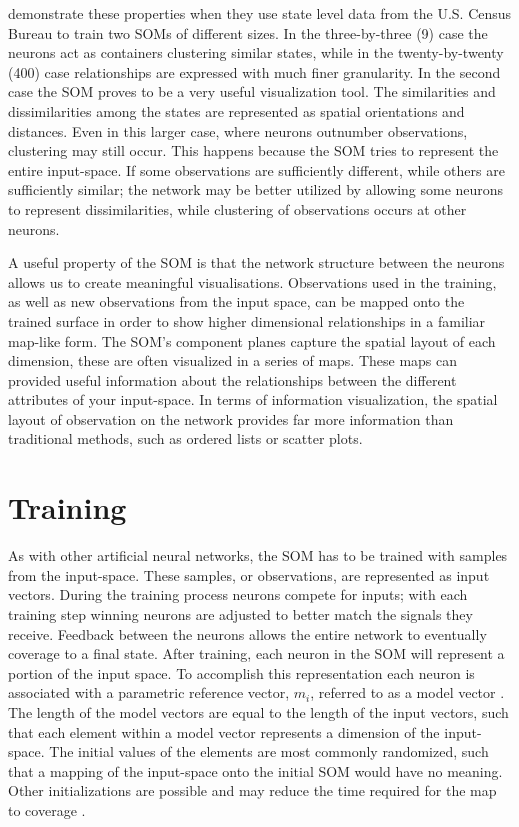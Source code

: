 \cite{skupin08} demonstrate these properties when they use state level data
from the U.S. Census Bureau to train two SOMs of different sizes.  In the
three-by-three (9) case the neurons act as containers clustering similar
states, while in the twenty-by-twenty (400) case relationships are expressed
with much finer granularity.  In the second case the SOM proves to be a very
useful visualization tool.  The similarities and dissimilarities among the
states are represented as spatial orientations and distances.  Even in this
larger case, where neurons outnumber observations, clustering may still occur.
This happens because the SOM tries to represent the entire input-space.  If
some observations are sufficiently different, while others are sufficiently
similar; the network may be better utilized by allowing some neurons to
represent dissimilarities, while clustering of observations occurs at other
neurons.

A useful property of the SOM is that the network structure between the neurons
allows us to create meaningful visualisations.  Observations used in the
training, as well as new observations from the input space, can be mapped
onto the trained surface in order to show higher dimensional relationships in a
familiar map-like form. The SOM's component planes capture the spatial layout
of each dimension, these are often visualized in a series of maps.  These
maps can provided useful information about the relationships between the
different attributes of your input-space.  In terms of information
visualization, the spatial layout of observation on the network provides far
more information than traditional methods, such as ordered lists or scatter
plots.

\section{Training}
\label{bg:train}
As with other artificial neural networks, the SOM has to be trained with
samples from the input-space.  These samples, or observations, are represented
as input vectors.  During the training process neurons compete for inputs;
with each training step winning neurons are adjusted to better match the
signals they receive.  Feedback between the neurons allows the entire network to
eventually coverage to a final state. After training, each neuron in the SOM
will represent a portion of the input space.  To accomplish this
representation each neuron is associated with a parametric reference vector,
\(m_i\), referred to as a model vector \citep{Kohonen2000}.  The length of the
model vectors are equal to the length of the input vectors, such that each
element within a model vector represents a dimension of the input-space.  The
initial values of the elements are most commonly randomized, such that a
mapping of the input-space onto the initial SOM would have no meaning. Other
initializations are possible and may reduce the time required for the map to
coverage \citep{Kohonen2000}.

